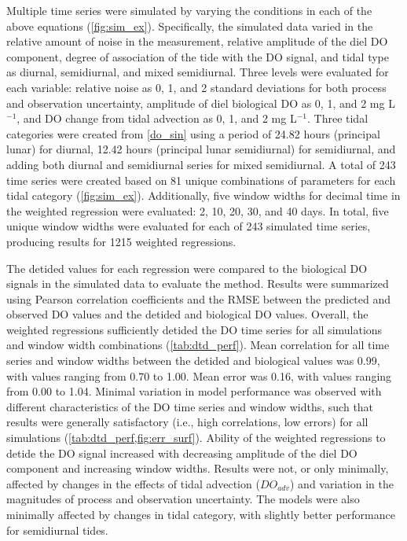 \documentclass[letterpaper,12pt,oneside]{article}\usepackage[]{graphicx}\usepackage[]{color}
\begin{document}
Multiple time series were simulated by varying the conditions in each of the above equations (\cref{fig:sim_ex}). Specifically, the simulated data varied in the relative amount of noise in the measurement, relative amplitude of the diel \ac{DO} component, degree of association of the tide with the \ac{DO} signal, and tidal type as diurnal, semidiurnal, and mixed semidiurnal.  Three levels were evaluated for each variable: relative noise as 0, 1, and 2 standard deviations for both process and observation uncertainty, amplitude of diel biological \ac{DO} as 0, 1, and 2 mg L$^{-1}$, and \ac{DO} change from tidal advection as 0, 1, and 2 mg L$^{-1}$.  Three tidal categories were created from \cref{do_sin} using a period of 24.82 hours (principal lunar) for diurnal, 12.42 hours (principal lunar semidiurnal) for semidiurnal, and adding both diurnal and semidiurnal series for mixed semidiurnal. A total of 243 time series were created based on 81 unique combinations of parameters for each tidal category (\cref{fig:sim_ex}).  Additionally, five window widths for decimal time in the weighted regression were evaluated: 2, 10, 20, 30, and 40 days.  In total, five unique window widths were evaluated for each of 243 simulated time series, producing results for 1215 weighted regressions.

The detided values for each regression were compared to the biological \ac{DO} signals in the simulated data to evaluate the method. Results were summarized using Pearson correlation coefficients and the \ac{RMSE} between the predicted and observed \ac{DO} values and the detided and biological \ac{DO} values.  Overall, the weighted regressions sufficiently detided the \ac{DO} time series for all simulations and window width combinations (\cref{tab:dtd_perf}). Mean correlation for all time series and window widths between the detided and biological values was 0.99, with values ranging from 0.70 to 1.00.  Mean error was 0.16, with values ranging from 0.00 to 1.04.  Minimal variation in model performance was observed with different characteristics of the \ac{DO} time series and window widths, such that results were generally satisfactory (i.e., high correlations, low errors) for all simulations (\cref{tab:dtd_perf,fig:err_surf}).  Ability of the weighted regressions to detide the \ac{DO} signal increased with decreasing amplitude of the diel \ac{DO} component and increasing window widths.  Results were not, or only minimally, affected by changes in the effects of tidal advection ($DO_{adv}$) and variation in the magnitudes of process and observation uncertainty.  The models were also minimally affected by changes in tidal category, with slightly better performance for semidiurnal tides.   
\end{document}
